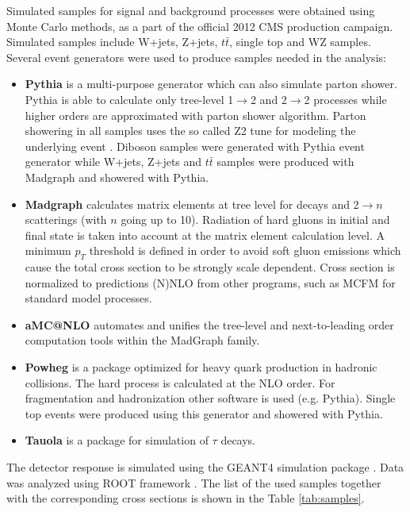 \par Simulated samples for signal and background processes were obtained using Monte Carlo methods, as a part of the official 2012 CMS production campaign. Simulated samples include W+jets, Z+jets, $t\bar{t}$, single top and WZ samples. Several event generators were used to produce samples needed in the analysis:
\begin{itemize}
\item \textbf{Pythia} \cite{Sjostrand:2006za,Sjostrand:2007gs} is a multi-purpose generator which can also simulate parton shower. Pythia is able to calculate only tree-level 1$\rightarrow$2 and 2$\rightarrow$2 processes while higher orders are approximated with parton shower algorithm. Parton showering in all samples uses the so called Z2 tune for modeling the underlying event \cite{Field:2010bc,Chatrchyan:2013ala}. Diboson samples were generated with Pythia event generator while W+jets, Z+jets and $t\bar{t}$ samples were produced with Madgraph and showered with Pythia.  
\item \textbf{Madgraph} \cite{Alwall:2011uj} calculates matrix elements at tree level for decays and 2$\rightarrow n$ scatterings (with $n$ going up to 10). Radiation of hard gluons in initial and final state is taken into account at the matrix element calculation level. A minimum $p_T$ threshold is defined in order to avoid soft gluon emissions which cause the total cross section to be strongly scale dependent. Cross section is normalized to predictions (N)NLO from other programs, such as MCFM \cite{Campbell:2010ff} for standard model processes.   
\item \textbf{aMC@NLO} \cite{Alwall:2014hca} automates and unifies the tree-level and next-to-leading order computation tools within the MadGraph family.
\item \textbf{Powheg} \cite{Oleari:2010nx} is a package optimized for heavy quark production in hadronic collisions. The hard process is calculated at the NLO order. For fragmentation and hadronization other software is used (e.g. Pythia). Single top events were produced using this generator and showered with Pythia. 
\item \textbf{Tauola} \cite{Jadach:1993hs} is a package for simulation of $\tau$ decays.
\end{itemize}
        
The detector response is simulated using the GEANT4 simulation package \cite{Agostinelli:2002hh}. Data was analyzed using ROOT framework \cite{Brun:1997pa}. The list of the used samples together with the corresponding cross sections is shown in the Table \ref{tab:samples}.

